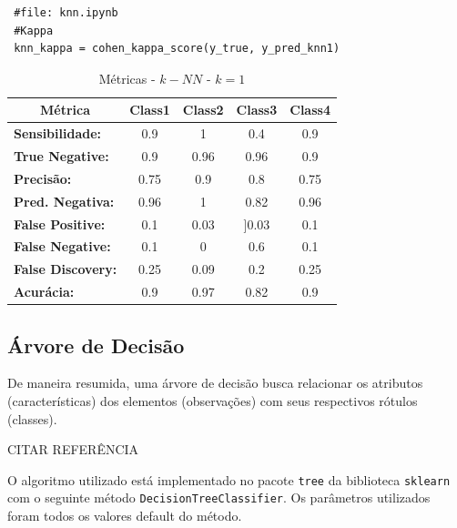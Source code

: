 \documentclass[
	article,			%
	11pt,				%
	oneside,			%
	a4paper,			%
	english,			%
	brazil,				%
	sumario=tradicional
	]{abntex2}
\begin{document}
\begin{verbatim}
 #file: knn.ipynb
 #Kappa
 knn_kappa = cohen_kappa_score(y_true, y_pred_knn1)
\end{verbatim}

\begin{table}[h!]
\centering
\begin{tabular}{|l|c|c|c|c|}
\hline
\multicolumn{1}{|c|}{\textbf{Métrica}} & \textbf{Class1} & \textbf{Class2} & \textbf{Class3} & \textbf{Class4} \\ \hline
\textbf{Sensibilidade:}                & 0.9             & 1               & 0.4             & 0.9             \\ \hline
\textbf{True Negative:}                & 0.9             & 0.96            & 0.96            & 0.9             \\ \hline
\textbf{Precisão:}                     & 0.75            & 0.9             & 0.8             & 0.75            \\ \hline
\textbf{Pred. Negativa:}               & 0.96            & 1               & 0.82            & 0.96            \\ \hline
\textbf{False Positive:}               & 0.1             & 0.03            & {]}0.03         & 0.1             \\ \hline
\textbf{False Negative:}               & 0.1             & 0               & 0.6             & 0.1             \\ \hline
\textbf{False Discovery:}              & 0.25            & 0.09            & 0.2             & 0.25            \\ \hline
\textbf{Acurácia:}                     & 0.9             & 0.97            & 0.82            & 0.9             \\ \hline
\end{tabular}
\caption{Métricas - $k-NN$ - $k=1$}
\label{tab:metrics_knn}
\end{table}

\subsection{Árvore de Decisão}

De maneira resumida, uma árvore de decisão busca relacionar os atributos (características) dos elementos (observações) com seus respectivos rótulos (classes). 

CITAR REFERÊNCIA

O algoritmo utilizado está implementado no pacote \verb|tree| da biblioteca \verb|sklearn| com o seguinte método \verb|DecisionTreeClassifier|. Os parâmetros utilizados foram todos os valores default do método.
\end{document}
